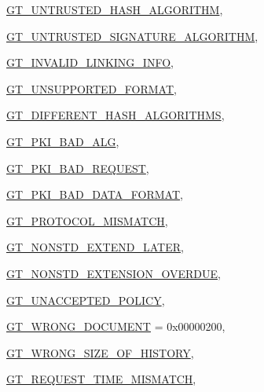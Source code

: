 \begin{DoxyCompactItemize}
\hyperlink{group__common_gga43b0c0f44bcf02caf0c2866b1f647a35ae7f12fbec6304d0fb0b98dbdaa500b03}{GT\_\-UNTRUSTED\_\-HASH\_\-ALGORITHM}, 
\par
\hyperlink{group__common_gga43b0c0f44bcf02caf0c2866b1f647a35a3537820bc5194cfbcb582ab92223ac7c}{GT\_\-UNTRUSTED\_\-SIGNATURE\_\-ALGORITHM}, 
\par
\hyperlink{group__common_gga43b0c0f44bcf02caf0c2866b1f647a35a7d46db9f79e9d719f81f0990e5629767}{GT\_\-INVALID\_\-LINKING\_\-INFO}, 
\par
\hyperlink{group__common_gga43b0c0f44bcf02caf0c2866b1f647a35aedb9c391823de3ce19caa656ca9b5f59}{GT\_\-UNSUPPORTED\_\-FORMAT}, 
\par
\hyperlink{group__common_gga43b0c0f44bcf02caf0c2866b1f647a35a49d650f235664fd42ceec662ee864e54}{GT\_\-DIFFERENT\_\-HASH\_\-ALGORITHMS}, 
\par
\hyperlink{group__common_gga43b0c0f44bcf02caf0c2866b1f647a35a69490c49019ff4aff3f355a1658370e4}{GT\_\-PKI\_\-BAD\_\-ALG}, 
\par
\hyperlink{group__common_gga43b0c0f44bcf02caf0c2866b1f647a35a4d2b2181ff62acdf48a447d33ab2cc30}{GT\_\-PKI\_\-BAD\_\-REQUEST}, 
\par
\hyperlink{group__common_gga43b0c0f44bcf02caf0c2866b1f647a35ab5fc75cc500cf242e1700bef5268f7a3}{GT\_\-PKI\_\-BAD\_\-DATA\_\-FORMAT}, 
\par
\hyperlink{group__common_gga43b0c0f44bcf02caf0c2866b1f647a35a93ca0159bbda5776e6aa074c6c9dcf55}{GT\_\-PROTOCOL\_\-MISMATCH}, 
\par
\hyperlink{group__common_gga43b0c0f44bcf02caf0c2866b1f647a35a03a88f516786427e27f74af7525710a8}{GT\_\-NONSTD\_\-EXTEND\_\-LATER}, 
\par
\hyperlink{group__common_gga43b0c0f44bcf02caf0c2866b1f647a35a08994728ca3424b360f47b8bc2831328}{GT\_\-NONSTD\_\-EXTENSION\_\-OVERDUE}, 
\par
\hyperlink{group__common_gga43b0c0f44bcf02caf0c2866b1f647a35adea40e832518f9b68c7561e7bf23c408}{GT\_\-UNACCEPTED\_\-POLICY}, 
\par
\hyperlink{group__common_gga43b0c0f44bcf02caf0c2866b1f647a35a9f505c283a024218f3453e3a3ecaaf50}{GT\_\-WRONG\_\-DOCUMENT} =  0x00000200, 
\par
\hyperlink{group__common_gga43b0c0f44bcf02caf0c2866b1f647a35a14ca98db27d15382884963cdc73ceb7c}{GT\_\-WRONG\_\-SIZE\_\-OF\_\-HISTORY}, 
\par
\hyperlink{group__common_gga43b0c0f44bcf02caf0c2866b1f647a35a4aaf89798478916e6fd0c52d91b925b9}{GT\_\-REQUEST\_\-TIME\_\-MISMATCH}, 
\par

\end{DoxyCompactItemize}
